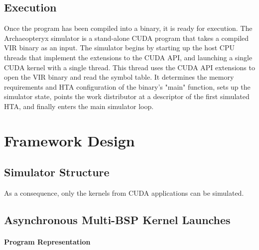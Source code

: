 \documentclass[conference, 10pt]{IEEEtran}
\begin{document}

\subsection{Execution}

Once the program has been compiled into a binary, it is ready for execution. 
The Archaeopteryx simulator is a stand-alone CUDA program that takes a compiled
VIR binary as an input.  The simulator begins by starting up the host CPU
threads that implement the extensions to the CUDA API, and launching a single
CUDA kernel with a single thread.   This thread uses the CUDA API extensions to
open the VIR binary and read the symbol table.  It determines the memory
requirements and HTA configuration of the binary's "main" function, sets up the
simulator state, points the work distributor at a descriptor of the first
simulated HTA, and finally enters the main simulator loop.  






\section{Framework Design}
\label{sec:framework-design}

\subsection{Simulator Structure}

As a consequence, only the kernels from CUDA applications can be simulated.  

\subsection{Asynchronous Multi-BSP Kernel Launches}

\paragraph{Program Representation}
\end{document}
